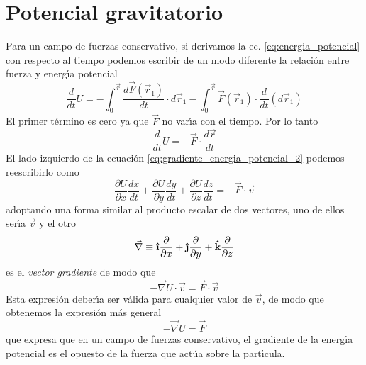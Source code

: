 \section{Potencial gravitatorio}
Para un campo de fuerzas conservativo\cite{Golwala2007}, si derivamos la ec. \ref{eq:energia_potencial} con respecto al tiempo podemos escribir de un modo diferente la relaci\'on entre fuerza y energ\'\i{}a potencial
\begin{equation}
\frac{d}{dt}U=-\int_0^{\vec{r}} \frac{d\vec{F}(\vec{r}_1)}{dt} \cdot d\vec{r}_1 -\int_0^{\vec{r}}\vec{F}(\vec{r}_1) \cdot \frac{d}{dt} (d\vec{r}_1)
\label{eq:gradiente_energia_potencial}
\end{equation}
El primer t\'ermino es cero ya que $\vec{F}$ no var\'\i{}a con el tiempo. Por lo tanto 
\begin{equation}
\frac{d}{dt}U= - \vec{F} \cdot \frac{d\vec{r}}{dt}
\label{eq:gradiente_energia_potencial_2}
\end{equation}
El lado izquierdo de la ecuaci\'on \ref{eq:gradiente_energia_potencial_2} podemos reescribirlo como
\begin{equation}
\frac{\partial U}{\partial x}\frac{dx}{dt}+\frac{\partial U}{\partial y}\frac{dy}{dt}+\frac{\partial U}{\partial z}\frac{dz}{dt}= - \vec{F} \cdot \vec{v}
\label{eq:gradiente_energia_potencial_3}
\end{equation}
adoptando una forma similar al producto escalar de dos vectores, uno de ellos ser\'\i{}a $\vec{v}$ y el otro 
\begin{equation}
\vec{\nabla} \equiv \uvec{\i} \frac{\partial}{\partial x}+ \uvec{\j} \frac{\partial}{\partial y}+\uvec{k} \frac{\partial}{\partial z}
\label{eq:definicionGradiente}
\end{equation}
es el \emph{vector gradiente} de modo que
\begin{equation}
- \vec{\nabla} U \cdot \vec{v}=  \vec{F} \cdot \vec{v}
\label{eq:gradiente_energia_potencial_4}
\end{equation} 
Esta expresi\'on deber\'\i{}a ser v\'alida para cualquier valor de $\vec{v}$, de modo que obtenemos la expresi\'on m\'as general 
\begin{equation}
- \vec{\nabla} U =  \vec{F} 
\label{eq:gradiente_energia_potencial_Fuerza}
\end{equation}
que expresa que en un campo de fuerzas conservativo, el gradiente de la energ\'\i{}a potencial es el opuesto de la fuerza que act\'ua sobre la part\'\i{}cula. 

